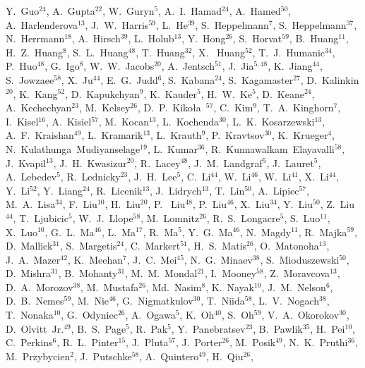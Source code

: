 \documentclass[%
 reprint,	
showpacs,
 amsmath,amssymb,
 aps,
 prc,
]{revtex4-1}
\begin{document}
{Y.~Guo$^{24}$,
A.~Gupta$^{22}$,
W.~Guryn$^{5}$,
A.~I.~Hamad$^{24}$,
A.~Hamed$^{50}$,
A.~Harlenderova$^{13}$,
J.~W.~Harris$^{59}$,
L.~He$^{39}$,
S.~Heppelmann$^{7}$,
S.~Heppelmann$^{37}$,
N.~Herrmann$^{18}$,
A.~Hirsch$^{39}$,
L.~Holub$^{13}$,
Y.~Hong$^{26}$,
S.~Horvat$^{59}$,
B.~Huang$^{11}$,
H.~Z.~Huang$^{8}$,
S.~L.~Huang$^{48}$,
T.~Huang$^{32}$,
X.~ Huang$^{52}$,
T.~J.~Humanic$^{34}$,
P.~Huo$^{48}$,
G.~Igo$^{8}$,
W.~W.~Jacobs$^{20}$,
A.~Jentsch$^{51}$,
J.~Jia$^{5,48}$,
K.~Jiang$^{44}$,
S.~Jowzaee$^{58}$,
X.~Ju$^{44}$,
E.~G.~Judd$^{6}$,
S.~Kabana$^{24}$,
S.~Kagamaster$^{27}$,
D.~Kalinkin$^{20}$,
K.~Kang$^{52}$,
D.~Kapukchyan$^{9}$,
K.~Kauder$^{5}$,
H.~W.~Ke$^{5}$,
D.~Keane$^{24}$,
A.~Kechechyan$^{23}$,
M.~Kelsey$^{26}$,
D.~P.~Kiko\l{}a~$^{57}$,
C.~Kim$^{9}$,
T.~A.~Kinghorn$^{7}$,
I.~Kisel$^{16}$,
A.~Kisiel$^{57}$,
M.~Kocan$^{13}$,
L.~Kochenda$^{30}$,
L.~K.~Kosarzewski$^{13}$,
A.~F.~Kraishan$^{49}$,
L.~Kramarik$^{13}$,
L.~Krauth$^{9}$,
P.~Kravtsov$^{30}$,
K.~Krueger$^{4}$,
N.~Kulathunga~Mudiyanselage$^{19}$,
L.~Kumar$^{36}$,
R.~Kunnawalkam~Elayavalli$^{58}$,
J.~Kvapil$^{13}$,
J.~H.~Kwasizur$^{20}$,
R.~Lacey$^{48}$,
J.~M.~Landgraf$^{5}$,
J.~Lauret$^{5}$,
A.~Lebedev$^{5}$,
R.~Lednicky$^{23}$,
J.~H.~Lee$^{5}$,
C.~Li$^{44}$,
W.~Li$^{46}$,
W.~Li$^{41}$,
X.~Li$^{44}$,
Y.~Li$^{52}$,
Y.~Liang$^{24}$,
R.~Licenik$^{13}$,
J.~Lidrych$^{13}$,
T.~Lin$^{50}$,
A.~Lipiec$^{57}$,
M.~A.~Lisa$^{34}$,
F.~Liu$^{10}$,
H.~Liu$^{20}$,
P.~ Liu$^{48}$,
P.~Liu$^{46}$,
X.~Liu$^{34}$,
Y.~Liu$^{50}$,
Z.~Liu$^{44}$,
T.~Ljubicic$^{5}$,
W.~J.~Llope$^{58}$,
M.~Lomnitz$^{26}$,
R.~S.~Longacre$^{5}$,
S.~Luo$^{11}$,
X.~Luo$^{10}$,
G.~L.~Ma$^{46}$,
L.~Ma$^{17}$,
R.~Ma$^{5}$,
Y.~G.~Ma$^{46}$,
N.~Magdy$^{11}$,
R.~Majka$^{59}$,
D.~Mallick$^{31}$,
S.~Margetis$^{24}$,
C.~Markert$^{51}$,
H.~S.~Matis$^{26}$,
O.~Matonoha$^{13}$,
J.~A.~Mazer$^{42}$,
K.~Meehan$^{7}$,
J.~C.~Mei$^{45}$,
N.~G.~Minaev$^{38}$,
S.~Mioduszewski$^{50}$,
D.~Mishra$^{31}$,
B.~Mohanty$^{31}$,
M.~M.~Mondal$^{21}$,
I.~Mooney$^{58}$,
Z.~Moravcova$^{13}$,
D.~A.~Morozov$^{38}$,
M.~Mustafa$^{26}$,
Md.~Nasim$^{8}$,
K.~Nayak$^{10}$,
J.~M.~Nelson$^{6}$,
D.~B.~Nemes$^{59}$,
M.~Nie$^{46}$,
G.~Nigmatkulov$^{30}$,
T.~Niida$^{58}$,
L.~V.~Nogach$^{38}$,
T.~Nonaka$^{10}$,
G.~Odyniec$^{26}$,
A.~Ogawa$^{5}$,
K.~Oh$^{40}$,
S.~Oh$^{59}$,
V.~A.~Okorokov$^{30}$,
D.~Olvitt~Jr.$^{49}$,
B.~S.~Page$^{5}$,
R.~Pak$^{5}$,
Y.~Panebratsev$^{23}$,
B.~Pawlik$^{35}$,
H.~Pei$^{10}$,
C.~Perkins$^{6}$,
R.~L.~Pinter$^{15}$,
J.~Pluta$^{57}$,
J.~Porter$^{26}$,
M.~Posik$^{49}$,
N.~K.~Pruthi$^{36}$,
M.~Przybycien$^{2}$,
J.~Putschke$^{58}$,
A.~Quintero$^{49}$,
H.~Qiu$^{26}$,
}
\end{document}
